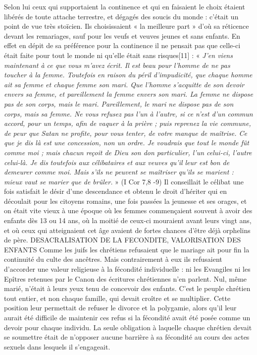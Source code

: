 Selon lui ceux qui supportaient la continence et qui en faisaient le choix étaient libérés de toute attache terrestre, et dégagés des soucis du monde : c'était un point de vue très stoïcien. Ils choisissaient « la meilleure part » d'où sa réticence devant les remariages, sauf pour les veufs et veuves jeunes et sans enfants. En effet en dépit de sa préférence pour la continence il ne pensait pas que celle-ci était faite pour tout le monde ni qu'elle était sans risques[11] : « \emph{J'en viens maintenant à ce que vous m'avez écrit. Il est beau pour l'homme de ne pas toucher à la femme. Toutefois en raison du péril d'impudicité, que chaque homme ait sa femme et chaque femme son mari. Que l'homme s'acquitte de son devoir envers sa femme, et pareillement la femme envers son mari. La femme ne dispose pas de son corps, mais le mari. Pareillement, le mari ne dispose pas de son corps, mais sa femme. Ne vous refusez pas l'un à l'autre, si ce n'est d'un commun accord, pour un temps, afin de vaquer à la prière ; puis reprenez la vie commune, de peur que Satan ne profite, pour vous tenter, de votre manque de maîtrise. Ce que je dis là est une concession, non un ordre. Je voudrais que tout le monde fût comme moi ; mais chacun reçoit de Dieu son don particulier, l'un celui-ci, l'autre celui-là. Je dis toutefois aux célibataires et aux veuves qu'il leur est bon de demeurer comme moi. Mais s'ils ne peuvent se maîtriser qu'ils se marient : mieux vaut se marier que de brûler.} » (I Cor 7,8 -9)
 Il conseillait le célibat une fois satisfait le désir d'une descendance et obtenu le droit d'hériter qui en découlait pour les citoyens romains, une fois passées la jeunesse et ses orages, et on était vite vieux à une époque où les femmes commençaient souvent à avoir des enfants dès 13 ou 14 ans, où la moitié de ceux-ci mouraient avant leurs vingt ans, et où ceux qui atteignaient cet âge avaient de fortes chances d'être déjà orphelins de père. 
DESACRALISATION DE LA FECONDITE, VALORISATION DES ENFANTS
 Comme les juifs les chrétiens refusaient que le mariage ait pour fin la continuité du culte des ancêtres. Mais contrairement à eux ils refusaient d'accorder une valeur religieuse à la fécondité individuelle : ni les Evangiles ni les Epîtres retenues par le Canon des écritures chrétiennes n'en parlent. Nul, même marié, n'était à leurs yeux tenu de concevoir des enfants. C'est le peuple chrétien tout entier, et non chaque famille, qui devait croître et se multiplier. Cette position leur permettait de refuser le divorce et la polygamie, alors qu'il leur aurait été difficile de maintenir ces refus si la fécondité avait été posée comme un devoir pour chaque individu. La seule obligation à laquelle chaque chrétien devait se soumettre était de n'opposer aucune barrière à sa fécondité au cours des actes sexuels dans lesquels il s'engageait. 
